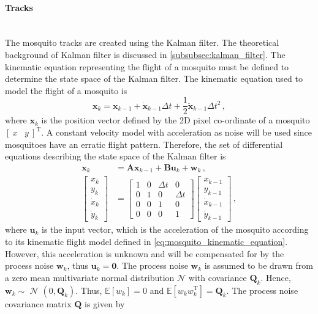 \paragraph{Tracks}\mbox{}\\
The mosquito tracks are created using the Kalman filter. The theoretical background of Kalman filter is discussed in \autoref{subsubsec:kalman_filter}. The kinematic equation representing the flight of a mosquito must be defined to determine the state space of the Kalman filter. The kinematic equation used to model the flight of a mosquito is
\begin{equation}
  \label{eq:mosquito_kinematic_equation}
  \mathbf{x}_{k} = \mathbf{x}_{k-1} + \mathbf{\dot{x}}_{k-1}\Delta t + \frac{1}{2}\mathbf{\ddot{{x}}}_{k-1}\Delta t^2\,,
\end{equation}
where $\mathbf{x}_{k}$ is the position vector defined by the 2D pixel co-ordinate of a mosquito $[\:x\;\;\;y\:]^\mathrm{T}$. A constant velocity model with acceleration as noise will be used since mosquitoes have an erratic flight pattern. Therefore, the set of differential equations describing the state space of the Kalman filter is
\begin{equation}
  \begin{split}
    \mathbf{x}_k
    & = \mathbf{Ax}_{k-1} + \mathbf{Bu}_k + \mathbf{w}_k\,, \\
    \begin{bmatrix}
      x_k       \\
      y_k       \\
      \dot{x}_k \\
      \dot{y}_k
    \end{bmatrix}
    & =
    \begin{bmatrix}
      1 & 0 & \Delta t & 0        \\
      0 & 1 & 0        & \Delta t \\
      0 & 0 & 1        & 0        \\
      0 & 0 & 0        & 1
    \end{bmatrix}
    \begin{bmatrix}
      x_{k-1}       \\
      y_{k-1}       \\
      \dot{x}_{k-1} \\
      \dot{y}_{k-1}
    \end{bmatrix}\,,
  \end{split}
\end{equation}
where $\mathbf{u}_k$ is the input vector, which is the acceleration of the mosquito according to its kinematic flight model defined in \autoref{eq:mosquito_kinematic_equation}. However, this acceleration is unknown and will be compensated for by the process noise $\mathbf{w}_k$, thus $\mathbf{u}_k = \mathbf{0}$. The process noise $\mathbf{w}_k$ is assumed to be drawn from a zero mean multivariate normal distribution $\mathcal{N}$ with covariance $\mathbf{Q}_k$. Hence, $\mathbf{w}_k \sim$ $\mathcal{N}$ $\left(0, \mathbf{Q}_k\right)$. Thus, $\mathbb{E}[w_k] = 0$ and $\mathbb{E}[w_kw_k^\mathrm{T}] = \mathbf{Q}_k$. The process noise covariance matrix $\mathbf{Q}$ is given by
